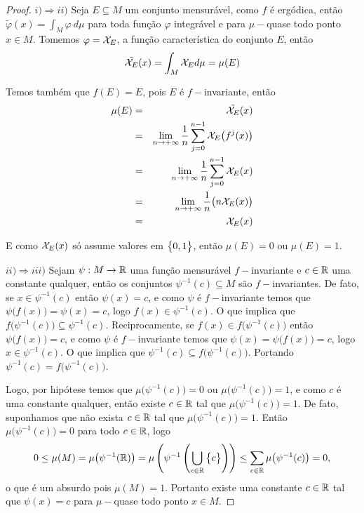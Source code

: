 \begin{proof} $i) \Rightarrow ii)$ Seja $E\subseteq M$ um conjunto mensurável, como $f$ é ergódica, então $\tilde{\varphi}(x)=\int_{M}\varphi\ d\mu$ para toda função $\varphi$ integrável e para $\mu-$quase todo ponto $x\in M$. Tomemos $\varphi=\mathcal{X}_{E}$, a função característica do conjunto $E$, então
\begin{equation*}
\tilde{\mathcal{X}_{\text{$E$}}}(x)=\int_{M}\mathcal{X}_{E}d\mu=\mu(E)
\end{equation*}

Temos também que $f(E)=E$, pois $E$ é $f-$invariante, então
\begin{eqnarray*}
\mu(E) & = & \tilde{\mathcal{X}_{\text{$E$}}}(x)\\
& = & \lim_{n\to+\infty}\dfrac{1}{n}\sum_{j=0}^{n-1}{\mathcal{X}_{E}\big(f^j(x)\big)}\\
& = & \lim_{n\to+\infty}\dfrac{1}{n}\sum_{j=0}^{n-1}{\mathcal{X}_{E}(x)}\\
& = & \lim_{n\to+\infty}\dfrac{1}{n}\big(n{\mathcal{X}_{E}(x)\big)}\\
& = & \mathcal{X}_{E}(x)
\end{eqnarray*}

E como $\mathcal{X}_{E}(x)$ só assume valores em $\big\{0,1\big\}$, então $\mu(E)=0$ ou $\mu(E)=1$.

$ii) \Rightarrow iii)$ Sejam $\psi:M\to\mathbb{R}$ uma função mensurável $f-$invariante e $c\in\mathbb{R}$ uma constante qualquer, então os conjuntos $\psi^{-1}(c)\subseteq M$ são $f-$invariantes. De fato, se $x\in\psi^{-1}(c)$ então $\psi(x)=c$, e como $\psi$ é $f-$invariante temos que $\psi\big(f(x)\big)=\psi(x)=c$, logo $f(x)\in\psi^{-1}(c)$. O que implica que $f\big(\psi^{-1}(c)\big)\subseteq \psi^{-1}(c)$. Reciprocamente, se $f(x)\in f\big(\psi^{-1}(c)\big)$ então $\psi\big(f(x)\big)=c$, e como $\psi$ é $f-$invariante temos que $\psi(x)=\psi\big(f(x)\big)=c$, logo $x\in\psi^{-1}(c)$. O que implica que $\psi^{-1}(c)\subseteq f\big(\psi^{-1}(c)\big)$. Portando $\psi^{-1}(c)=f\big(\psi^{-1}(c)\big)$.

Logo, por hipótese temos que $\mu\big(\psi^{-1}(c)\big)=0$ ou $\mu\big(\psi^{-1}(c)\big)=1$, e como $c$ é uma constante qualquer, então existe $c\in\mathbb{R}$ tal que $\mu\big(\psi^{-1}(c)\big)=1$. De fato, suponhamos que não exista $c\in\mathbb{R}$ tal que $\mu\big(\psi^{-1}(c)\big)=1$. Então $\mu\big(\psi^{-1}(c)\big)=0$ para todo $c\in\mathbb{R}$, logo
\begin{equation*}
0\leq\mu(M)=\mu\big(\psi^{-1}(\mathbb{R})\big)=\mu\left(\psi^{-1}\left(\bigcup_{c\in\mathbb{R}}\big\{c\big\}\right)\right)\leq\sum_{c\in\mathbb{R}}\mu\big(\psi^{-1}(c)\big)=0,
\end{equation*}
o que é um absurdo pois $\mu(M)=1$. Portanto existe uma constante $c\in\mathbb{R}$ tal que $\psi(x)=c$ para $\mu-$quase todo ponto $x\in M$.


\end{proof}
